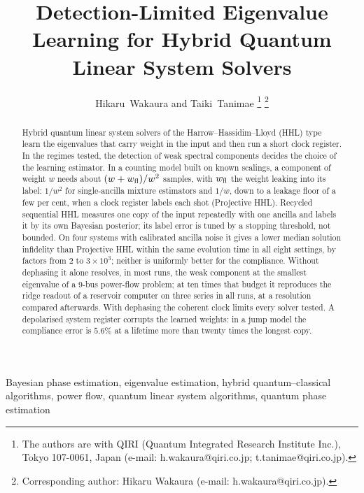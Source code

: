 \documentclass[journal]{IEEEtran}
\begin{document}
\title{Detection-Limited Eigenvalue Learning for Hybrid Quantum Linear System Solvers}
\author{Hikaru~Wakaura and Taiki~Tanimae%
\thanks{The authors are with QIRI (Quantum Integrated Research Institute Inc.), Tokyo 107-0061, Japan (e-mail: h.wakaura@qiri.co.jp; t.tanimae@qiri.co.jp).}%
\thanks{Corresponding author: Hikaru Wakaura (e-mail: h.wakaura@qiri.co.jp).}}

\maketitle

\begin{abstract}
Hybrid quantum linear system solvers of the Harrow--Hassidim--Lloyd (HHL) type learn the eigenvalues that carry weight in the input and then run a short clock register. In the regimes tested, the detection of weak spectral components decides the choice of the learning estimator. In a counting model built on known scalings, a component of weight $w$ needs about $(w+w_{\rm fl})/w^2$ samples, with $w_{\rm fl}$ the weight leaking into its label: $1/w^2$ for single-ancilla mixture estimators and $1/w$, down to a leakage floor of a few per cent, when a clock register labels each shot (Projective HHL). Recycled sequential HHL measures one copy of the input repeatedly with one ancilla and labels it by its own Bayesian posterior; its label error is tuned by a stopping threshold, not bounded. On four systems with calibrated ancilla noise it gives a lower median solution infidelity than Projective HHL within the same evolution time in all eight settings, by factors from $2$ to $3\times10^3$; neither is uniformly better for the compliance. Without dephasing it alone resolves, in most runs, the weak component at the smallest eigenvalue of a 9-bus power-flow problem; at ten times that budget it reproduces the ridge readout of a reservoir computer on three series in all runs, at a resolution compared afterwards. With dephasing the coherent clock limits every solver tested. A depolarised system register corrupts the learned weights: in a jump model the compliance error is $5.6\%$ at a lifetime more than twenty times the longest copy.
\end{abstract}

\begin{IEEEkeywords}
Bayesian phase estimation, eigenvalue estimation, hybrid quantum--classical algorithms, power flow, quantum linear system algorithms, quantum phase estimation
\end{IEEEkeywords}
\end{document}
